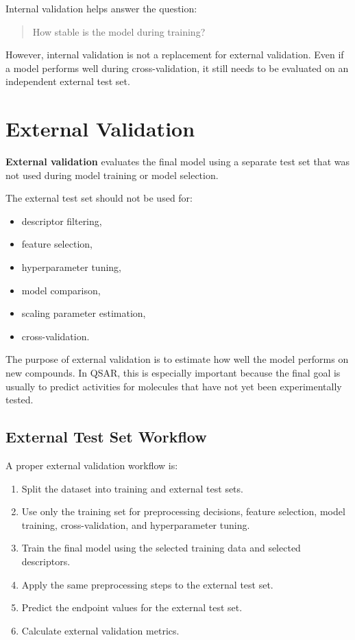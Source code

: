\documentclass[11pt]{report}
\newenvironment{Important note}{\begin{quote}\color{red}\textbf{Important note:} }{\end{quote}}
\begin{document}
Internal validation helps answer the question:

\begin{quote}
How stable is the model during training?
\end{quote}

However, internal validation is not a replacement for external validation. Even if a model performs well during cross-validation, it still needs to be evaluated on an independent external test set.

\section{External Validation}

\textbf{External validation} evaluates the final model using a separate test set that was not used during model training or model selection.

The external test set should not be used for:

\begin{itemize}[leftmargin=*]
    \item descriptor filtering,
    \item feature selection,
    \item hyperparameter tuning,
    \item model comparison,
    \item scaling parameter estimation,
    \item cross-validation.
\end{itemize}

The purpose of external validation is to estimate how well the model performs on new compounds. In QSAR, this is especially important because the final goal is usually to predict activities for molecules that have not yet been experimentally tested.

\subsection{External Test Set Workflow}

A proper external validation workflow is:

\begin{enumerate}[leftmargin=*]
    \item Split the dataset into training and external test sets.
    \item Use only the training set for preprocessing decisions, feature selection, model training, cross-validation, and hyperparameter tuning.
    \item Train the final model using the selected training data and selected descriptors.
    \item Apply the same preprocessing steps to the external test set.
    \item Predict the endpoint values for the external test set.
    \item Calculate external validation metrics.
\end{enumerate}
\end{document}

